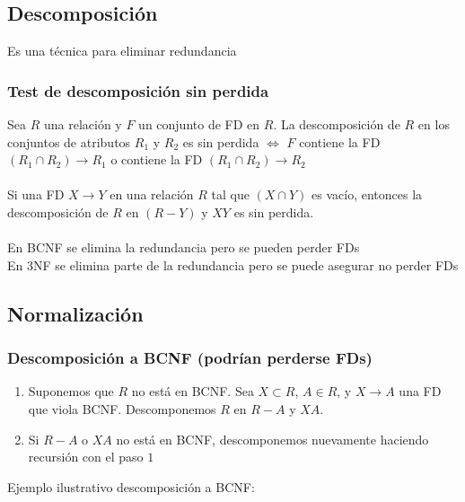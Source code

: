 \documentclass[11pt,letterpaper]{article}
\begin{document}
\subsection{Descomposición}
Es una técnica para eliminar redundancia

\subsubsection{Test de descomposición sin perdida}
Sea $R$ una relación y $F$ un conjunto de FD en $R$. La descomposición de $R$ en los conjuntos de atributos $R_1$ y $R_2$ es sin perdida $\Leftrightarrow$ $F$ contiene la FD $(R_1 \cap R_2) \rightarrow R_1$ o contiene la FD $(R_1 \cap R_2) \rightarrow R_2$ \\ \\
Si una FD $X \rightarrow Y$ en una relación $R$ tal que $(X \cap Y)$ es vacío, entonces la descomposición de $R$ en $(R-Y)$ y $XY$ es sin perdida. \\ \\
En BCNF se elimina la redundancia pero se pueden perder FDs \\
En 3NF se elimina parte de la redundancia pero se puede asegurar no perder FDs

\subsection{Normalización}
\subsubsection{Descomposición a BCNF (podrían perderse FDs)}
\begin{enumerate}
	\item Suponemos que $R$ no está en BCNF. Sea $X \subset R$, $A \in R$, y $X\rightarrow A$ una FD que viola BCNF. Descomponemos $R$ en $R-A$ y $XA$.
	\item Si $R - A$ o $XA$ no está en BCNF, descomponemos nuevamente haciendo recursión con el paso $1$
\end{enumerate}
Ejemplo ilustrativo descomposición a BCNF:
\begin{figure}[h]
\centering
{}
\end{figure}
\end{document}
